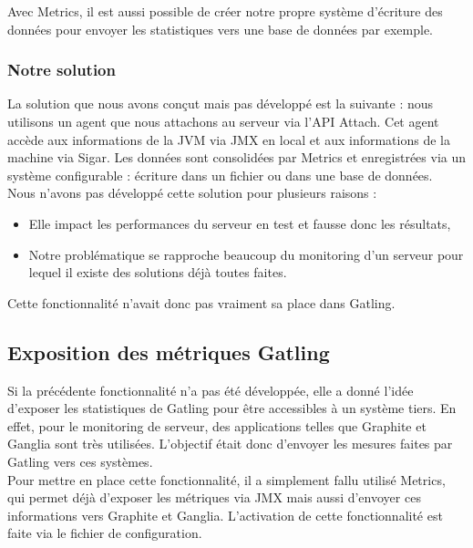 Avec Metrics, il est aussi possible de créer notre propre système d'écriture des données pour envoyer les statistiques vers une base de données par exemple.

\subsubsection{Notre solution}

La solution que nous avons conçut mais pas développé est la suivante : nous utilisons un agent que nous attachons au serveur via l'API Attach. Cet agent accède aux informations de la JVM via JMX en local et aux informations de la machine via Sigar. Les données sont consolidées par Metrics et enregistrées via un système configurable : écriture dans un fichier ou dans une base de données.\\

Nous n'avons pas développé cette solution pour plusieurs raisons :
\begin{itemize}
 \item Elle impact les performances du serveur en test et fausse donc les résultats,
 \item Notre problématique se rapproche beaucoup du monitoring d'un serveur pour lequel il existe des solutions déjà toutes faites.\\
\end{itemize}

Cette fonctionnalité n'avait donc pas vraiment sa place dans Gatling.

\subsection{Exposition des métriques Gatling}

Si la précédente fonctionnalité n'a pas été développée, elle a donné l'idée d'exposer les statistiques de Gatling pour être accessibles à un système tiers. En effet, pour le monitoring de serveur, des applications telles que Graphite et Ganglia sont très utilisées. L'objectif était donc d'envoyer les mesures faites par Gatling vers ces systèmes.\\

Pour mettre en place cette fonctionnalité, il a simplement fallu utilisé Metrics, qui permet déjà d'exposer les métriques via JMX mais aussi d'envoyer ces informations vers Graphite et Ganglia. L'activation de cette fonctionnalité est faite via le fichier de configuration.\\

